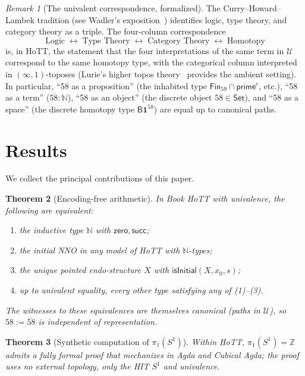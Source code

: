 \documentclass[12pt]{article}
\newtheorem{theorem}{Theorem}[section]
\theoremstyle{definition}
\theoremstyle{remark}
\newtheorem{remark}[theorem]{Remark}
\newcommand{\U}{\mathcal{U}}
\newcommand{\N}{\mathbb{N}}
\newcommand{\Z}{\mathbb{Z}}
\newcommand{\zero}{\mathsf{zero}}
\newcommand{\suc}{\mathsf{succ}}
\newcommand{\Sone}{S^1}
\begin{document}
\begin{remark}[The univalent correspondence, formalized]
The Curry--Howard--Lambek tradition (see Wadler's exposition~\cite{Wadler2015})
identifies logic, type theory, and category theory as a triple. The
four-column correspondence
\[
\text{Logic} \;\longleftrightarrow\;
\text{Type Theory} \;\longleftrightarrow\;
\text{Category Theory} \;\longleftrightarrow\;
\text{Homotopy}
\]
is, in HoTT, the statement that the four interpretations of the same term
in $\U$ correspond to the same homotopy type, with the categorical column
interpreted in $(\infty, 1)$-toposes (Lurie's higher topos
theory~\cite{Lurie} provides the ambient setting). In particular,
``58 as a proposition'' (the inhabited type
$\mathsf{Fin}_{59} \cap \mathsf{prime}^c$, etc.), ``58 as a term''
($\overline{58} : \N$), ``58 as an object'' (the discrete object
$58 \in \mathsf{Set}$), and ``58 as a space'' (the discrete homotopy type
$\mathsf{B}\mathbf{1}^{58}$) are equal up to canonical paths.
\end{remark}

\section{Results}
\label{sec:results}

We collect the principal contributions of this paper.

\begin{theorem}[Encoding-free arithmetic]
\label{thm:main}
In Book HoTT with univalence, the following are equivalent:
\begin{enumerate}
\item the inductive type $\N$ with $\zero, \suc$;
\item the initial NNO in any model of HoTT with $\N$-types;
\item the unique pointed endo-structure $X$ with $\mathsf{isInitial}(X, x_0, s)$;
\item up to univalent equality, every other type satisfying any of (1)--(3).
\end{enumerate}
The witnesses to these equivalences are themselves canonical (paths in
$\U$), so $58 := \overline{58}$ is independent of representation.
\end{theorem}

\begin{theorem}[Synthetic computation of \texorpdfstring{$\pi_1(\Sone{})$}{pi\_1(S\^{}1)}]
\label{thm:pi1-result}
Within HoTT, $\pi_1(\Sone{}) = \Z$ admits a fully formal proof
\cite{LicataShulman} that mechanizes in Agda and Cubical Agda; the proof
uses no external topology, only the HIT $\Sone$ and univalence.
\end{theorem}
\end{document}
